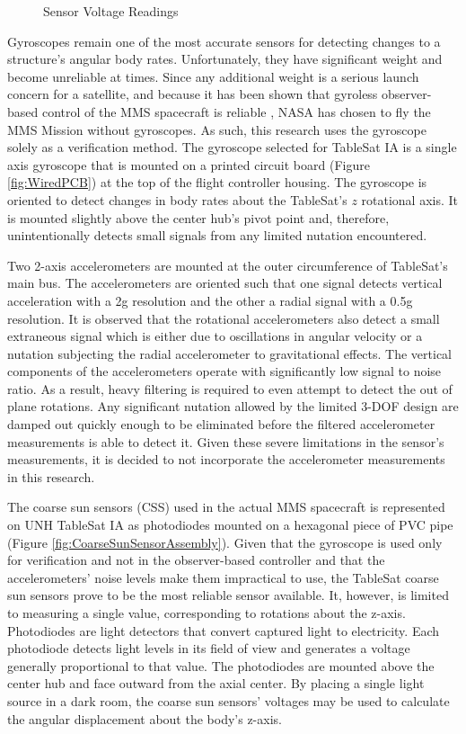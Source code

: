 \begin{figure}[H]
  \centerline{}
  \caption{Sensor Voltage Readings}
  \label{fig:SensorVoltageReadings}
\end{figure}

Gyroscopes remain one of the most accurate sensors for detecting changes to a structure's angular body rates.  Unfortunately, they have significant weight and become unreliable at times.  Since any additional weight is a serious launch concern for a satellite, and because it has been shown that gyroless observer-based control of the MMS spacecraft is reliable \cite{mushawehthesis}, NASA has chosen to fly the MMS Mission without gyroscopes.  As such, this research uses the gyroscope solely as a verification method.  The gyroscope selected for TableSat IA is a single axis gyroscope that is mounted on a printed circuit board (Figure \ref{fig:WiredPCB}) at the top of the flight controller housing.  The gyroscope is oriented to detect changes in body rates about the TableSat's $z$ rotational axis.  It is mounted slightly above the center hub's pivot point and, therefore, unintentionally detects small signals from any limited nutation encountered.

Two 2-axis accelerometers are mounted at the outer circumference of TableSat's main bus.  The accelerometers are oriented such that one signal detects vertical acceleration with a 2g resolution and the other a radial signal with a 0.5g resolution.  It is observed that the rotational accelerometers also detect a small extraneous signal which is either due to oscillations in angular velocity or a nutation subjecting the radial accelerometer to gravitational effects.  The vertical components of the accelerometers operate with significantly low signal to noise ratio.  As a result, heavy filtering is required to even attempt to detect the out of plane rotations.  Any significant nutation allowed by the limited 3-DOF design are damped out quickly enough to be eliminated before the filtered accelerometer measurements is able to detect it.  Given these severe limitations in the sensor's measurements, it is decided to not incorporate the accelerometer measurements in this research.

The coarse sun sensors (CSS) used in the actual MMS spacecraft is represented on UNH TableSat IA as photodiodes mounted on a hexagonal piece of PVC pipe (Figure \ref{fig:CoarseSunSensorAssembly}).  Given that the gyroscope is used only for verification and not in the observer-based controller and that the accelerometers' noise levels make them impractical to use, the TableSat coarse sun sensors prove to be the most reliable sensor available.  It, however, is limited to measuring a single value, corresponding to rotations about the z-axis.  Photodiodes are light detectors that convert captured light to electricity.  Each photodiode detects light levels in its field of view and generates a voltage generally proportional to that value.  The photodiodes are mounted above the center hub and face outward from the axial center.  By placing a single light source in a dark room, the coarse sun sensors' voltages may be used to calculate the angular displacement about the body's z-axis.

